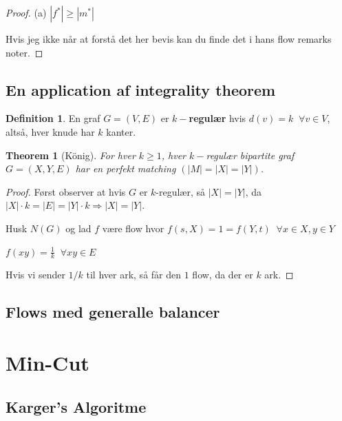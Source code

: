 \documentclass[11pt]{article}
\newtheorem{theorem}{Theorem}
\theoremstyle{definition}
\newtheorem{definition}{Definition}
\theoremstyle{remark}
\begin{document}
\begin{proof}

{\large (a) $|f^{*}| \geq |m^{*}|$}

Hvis jeg ikke når at forstå det her bevis kan du finde det i hans flow remarks noter.
\end{proof}

\subsection{En application af integrality theorem}
\label{subsec:label}


\begin{definition}
En graf $G= (V,E)$ er \textbf{$k-$regulær} hvis $d(v) = k\;\;\forall v \in V$, altså, hver knude har $k$ kanter. 
\end{definition}

\begin{theorem}[König]
For hver $k \geq 1$, hver $k-$regulær bipartite graf $G = (X,Y,E)$ har en perfekt matching $(|M| = |X| = |Y|)$.
\end{theorem}

\begin{proof}
Først observer at hvis $G$ er $k$-regulær, så $|X| = |Y|$, da $|X| \cdot k = |E| = |Y| \cdot k \Rightarrow |X| = |Y|$. 

Husk $N(G)$ og lad $f$ være flow hvor $f(s,X) = 1 = f(Y,t)\;\;\forall x \in X, y \in Y$

$f(xy) = \frac{1}{k}\;\; \forall xy \in E$

Hvis vi sender $1/k$ til hver ark, så får den $1$ flow, da der er $k$ ark.
\end{proof}



\subsection{Flows med generalle balancer}
\label{subsec:label}




\section{Min-Cut}
\label{sec:mincut}

\subsection{Karger's Algoritme}
\label{subsec:label}
\end{document}

